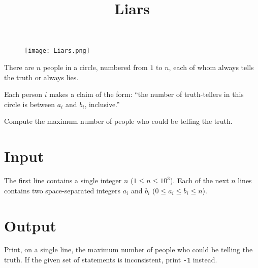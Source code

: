 \documentclass{article}
\title{Liars}
\date{}
\begin{document}
\maketitle
\begin{figure}[h!]
\centering
\texttt{[image: Liars.png]}
\end{figure}


There are $n$ people in a circle, numbered from $1$ to $n$,
each of whom always tells the truth or always lies.

Each person $i$ makes a claim of the form: ``the number of
truth-tellers in this circle is between $a_i$ and $b_i$, inclusive.''

Compute the maximum number of people who could be telling the truth.

\section{Input}

The first line contains a single integer $n$ ($1 \le n \le 10^3$).
Each of the next $n$ lines contains two space-separated integers $a_i$ and $b_i$
($0 \le a_i \le b_i \le n$).

\section{Output}

Print, on a single line, the maximum number of people who
could be telling the truth. If the given set of statements is inconsistent,
print \texttt{-1} instead.

\end{document}
